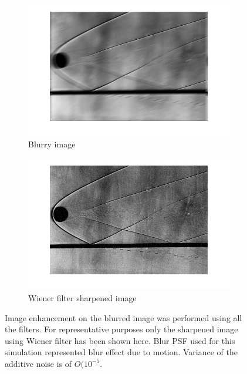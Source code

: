 \begin{figure}
        \centering
        \begin{subfigure}[b]{0.4\textwidth}
                \centering
                \includegraphics[width=\textwidth]{ssphere_motion.jpg}
                \caption{Blurry image}
                
        \end{subfigure}
        \begin{subfigure}[b]{0.4\textwidth}
                \centering
                \includegraphics[width=\textwidth]{ssphere_wiener.jpg}
                \caption{Wiener filter sharpened image} 
        \end{subfigure}
\caption{Image enhancement on the blurred image was performed using all the filters. For representative purposes only the sharpened image using Wiener filter has been shown here. Blur PSF used for this simulation represented blur effect due to motion. Variance of the additive noise is of $O(10^{-5}$. }
\end{figure}

